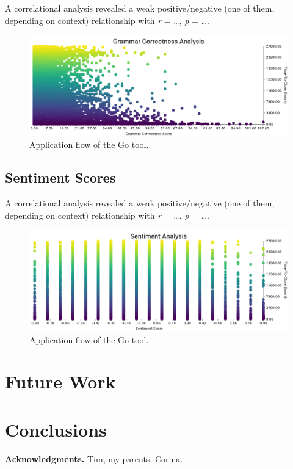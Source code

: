 \documentclass{mpaper}
\begin{document}
A correlational analysis revealed a weak positive/negative (one of them, depending on context) relationship
with \emph{r} = \dots, \emph{p} = \dots.

\begin{figure}
  \begin{center}
  \includegraphics[scale=0.25]{images/grammar_correctness.png}
  \end{center}
  \caption{\label{grammar}Application flow of the Go tool.}
  \end{figure}

\subsection{Sentiment Scores}

A correlational analysis revealed a weak positive/negative (one of them, depending on context) relationship
with \emph{r} = \dots, \emph{p} = \dots.

\begin{figure}
  \begin{center}
  \includegraphics[scale=0.25]{images/sentiment_analysis.png}
  \end{center}
  \caption{\label{sentiment}Application flow of the Go tool.}
  \end{figure}

\section{Future Work}\label{future_work}

\section{Conclusions}\label{conclusions}

\vskip8pt \noindent
{\bf Acknowledgments.}
Tim, my parents, Corina.



\end{document}
